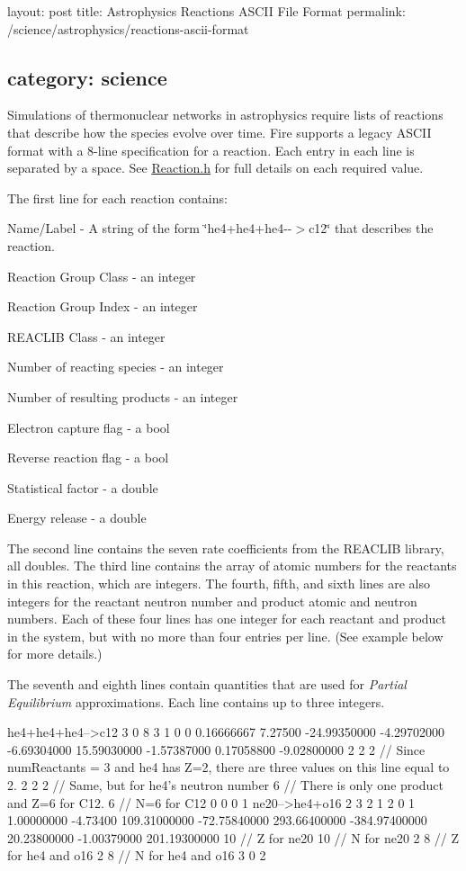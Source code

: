 

 layout\+: post title\+: Astrophysics Reactions A\+S\+C\+II File Format permalink\+: /science/astrophysics/reactions-\/ascii-\/format \subsection*{category\+: science }

Simulations of thermonuclear networks in astrophysics require lists of reactions that describe how the species evolve over time. Fire supports a legacy A\+S\+C\+II format with a 8-\/line specification for a reaction. Each entry in each line is separated by a space. See \hyperlink{a00290_source}{Reaction.\+h} for full details on each required value.

The first line for each reaction contains\+:


\begin{DoxyItemize}
\item Name/\+Label -\/ A string of the form \char`\"{}he4+he4+he4-\/-\/$>$c12\char`\"{} that describes the reaction.
\item Reaction Group Class -\/ an integer
\item Reaction Group Index -\/ an integer
\item R\+E\+A\+C\+L\+IB Class -\/ an integer
\item Number of reacting species -\/ an integer
\item Number of resulting products -\/ an integer
\item Electron capture flag -\/ a bool
\item Reverse reaction flag -\/ a bool
\item Statistical factor -\/ a double
\item Energy release -\/ a double
\end{DoxyItemize}

The second line contains the seven rate coefficients from the R\+E\+A\+C\+L\+IB library, all doubles. The third line contains the array of atomic numbers for the reactants in this reaction, which are integers. The fourth, fifth, and sixth lines are also integers for the reactant neutron number and product atomic and neutron numbers. Each of these four lines has one integer for each reactant and product in the system, but with no more than four entries per line. (See example below for more details.)

The seventh and eighth lines contain quantities that are used for {\itshape Partial Equilibrium} approximations. Each line contains up to three integers.


\begin{DoxyCode}
he4+he4+he4-->c12 3 0 8 3 1 0 0 0.16666667 7.27500
-24.99350000 -4.29702000 -6.69304000 15.59030000 -1.57387000 0.17058800 -9.02800000
2 2 2 // Since numReactants = 3 and he4 has Z=2, there are three values on this line equal to 2.
2 2 2 // Same, but for he4's neutron number
6 // There is only one product and Z=6 for C12.
6 // N=6 for C12
0 0 0 
1 
ne20-->he4+o16 2 3 2 1 2 0 1 1.00000000 -4.73400
109.31000000 -72.75840000 293.66400000 -384.97400000 20.23800000 -1.00379000 201.19300000
10 // Z for ne20
10 // N for ne20
2 8 // Z for he4 and o16
2 8 // N for he4 and o16
3 
0 2 
\end{DoxyCode}
 